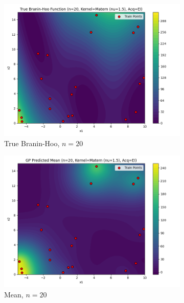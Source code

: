 \documentclass[a4paper,12pt]{article}
\begin{document}
\begin{figure}[H]
\begin{subfigure}{0.3\textwidth}
  \includegraphics[width=\linewidth]{Task-02/images/true_function_matern_n20_EI.png}
  \caption{True Branin-Hoo, $n=20$}
\end{subfigure}
\begin{subfigure}{0.3\textwidth}
    \includegraphics[width=\linewidth]{Task-02/images/gp_mean_matern_n20_EI.png}
    \caption{Mean, $n=20$}
\end{subfigure}
\begin{subfigure}{0.3\textwidth}

\end{subfigure}
\end{figure}
\end{document}
